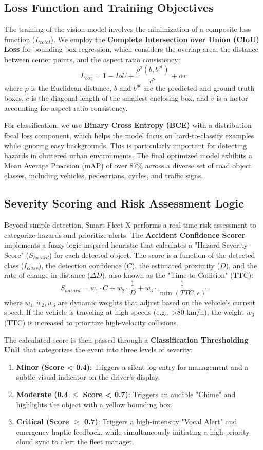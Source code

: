 \documentclass[conference]{IEEEtran}
\begin{document}
\subsection{Loss Function and Training Objectives}
The training of the vision model involves the minimization of a composite loss function ($L_{total}$). We employ the \textbf{Complete Intersection over Union (CIoU) Loss} for bounding box regression, which considers the overlap area, the distance between center points, and the aspect ratio consistency:
\[
L_{box} = 1 - IoU + \frac{\rho^2(b, b^{gt})}{c^2} + \alpha v
\]
where $\rho$ is the Euclidean distance, $b$ and $b^{gt}$ are the predicted and ground-truth boxes, $c$ is the diagonal length of the smallest enclosing box, and $v$ is a factor accounting for aspect ratio consistency.

For classification, we use \textbf{Binary Cross Entropy (BCE)} with a distribution focal loss component, which helps the model focus on hard-to-classify examples while ignoring easy backgrounds. This is particularly important for detecting hazards in cluttered urban environments. The final optimized model exhibits a Mean Average Precision (mAP) of over 87\% across a diverse set of road object classes, including vehicles, pedestrians, cycles, and traffic signs.

\subsection{Severity Scoring and Risk Assessment Logic}
Beyond simple detection, Smart Fleet X performs a real-time risk assessment to categorize hazards and prioritize alerts. The \textbf{Accident Confidence Scorer} implements a fuzzy-logic-inspired heuristic that calculates a "Hazard Severity Score" ($S_{hazard}$) for each detected object. The score is a function of the detected class ($I_{class}$), the detection confidence ($C$), the estimated proximity ($D$), and the rate of change in distance ($\Delta D$), also known as the "Time-to-Collision" (TTC):
\[
S_{hazard} = w_1 \cdot C + w_2 \cdot \frac{1}{D} + w_3 \cdot \frac{1}{\min(TTC, \epsilon)}
\]
where $w_1, w_2, w_3$ are dynamic weights that adjust based on the vehicle's current speed. If the vehicle is traveling at high speeds (e.g., >80 km/h), the weight $w_3$ (TTC) is increased to prioritize high-velocity collisions.

The calculated score is then passed through a \textbf{Classification Thresholding Unit} that categorizes the event into three levels of severity:
\begin{enumerate}
    \item \textbf{Minor (Score < 0.4)}: Triggers a silent log entry for management and a subtle visual indicator on the driver's display.
    \item \textbf{Moderate (0.4 $\leq$ Score < 0.7)}: Triggers an audible "Chime" and highlights the object with a yellow bounding box.
    \item \textbf{Critical (Score $\geq$ 0.7)}: Triggers a high-intensity "Vocal Alert" and emergency haptic feedback, while simultaneously initiating a high-priority cloud sync to alert the fleet manager.
\end{enumerate}
\end{document}
